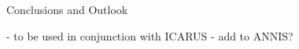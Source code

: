 
Conclusions and Outlook

- to be used in conjunction with  ICARUS \cite{gaertner2014corefviz, thiele2014corporaerrorviz}
- add to ANNIS?
